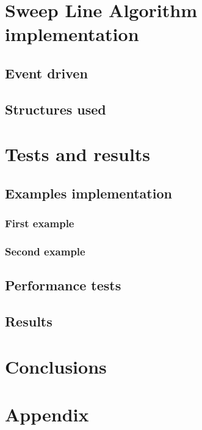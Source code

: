 \documentclass[10pt,a4paper,hidelinks]{article}
\begin{document}
\section{Sweep Line Algorithm implementation}
\subsection{Event driven}
\subsection{Structures used}

\section{Tests and results}
\subsection{Examples implementation}
\subsubsection{First example}
\subsubsection{Second example}
\subsection{Performance tests}
\subsection{Results}

\section{Conclusions}
\section{Appendix}


\newpage
\listoffigures
\lstlistoflistings
\listoftables
\end{document}
